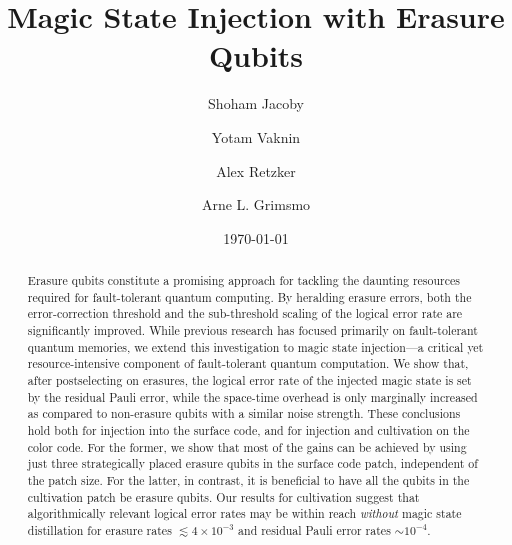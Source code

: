 \documentclass[twocolumn,
notitlepage,
aps,
prx,
floatfix,
superscriptaddress
]{revtex4-2}
\begin{document}

\title{Magic State Injection with Erasure Qubits}%


\author{Shoham Jacoby}
\author{Yotam Vaknin}
\author{Alex Retzker}
 \author{Arne L. Grimsmo}




\date{\today}%

\begin{abstract}
    Erasure qubits constitute a promising approach for tackling the daunting resources required for fault-tolerant quantum computing. By heralding erasure errors, both the error-correction threshold and the sub-threshold scaling of the logical error rate are significantly improved.
    While previous research has focused primarily on fault-tolerant quantum memories,
    we extend this investigation to magic state injection—a critical yet resource-intensive component of fault-tolerant quantum computation.
    We show that, after postselecting on erasures, the logical error rate of the injected magic state is set by the residual Pauli error,
    while the space-time overhead is only marginally increased as compared to non-erasure qubits with a similar noise strength.
    These conclusions hold both for injection into the surface code, and for injection and cultivation on the color code.
    For the former, we show that most of the gains can be achieved by using just three strategically placed erasure qubits in the surface code patch, independent of the patch size. For the latter, in contrast, it is beneficial to have all the qubits in the cultivation patch be erasure qubits.
    Our results for cultivation suggest that algorithmically relevant logical error rates may be within reach \emph{without} magic state distillation for erasure rates $\lesssim 4\times 10^{-3}$ and residual Pauli error rates $\sim 10^{-4}$. 
\end{abstract}
\maketitle
\end{document}
